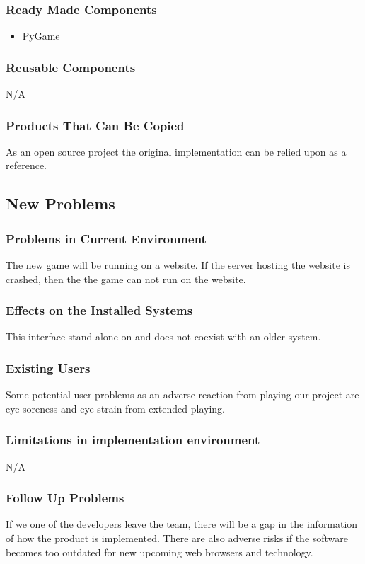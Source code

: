 \documentclass[12pt, titlepage]{article}
\begin{document}
\subsubsection{Ready Made Components}
\begin{itemize}
    \item PyGame
\end{itemize}
\subsubsection{Reusable Components}
N/A
\subsubsection{Products That Can Be Copied}
As an open source project the original implementation can be relied upon as a reference.
\subsection{New Problems}
\subsubsection{Problems in Current Environment}
The new game will be running on a website. If the server hosting the website is crashed, then the the game can not run on the website.
\subsubsection{Effects on the Installed Systems}
This interface stand alone on and does not coexist with an older system.
\subsubsection{Existing Users}
Some potential user problems as an adverse reaction from playing our project are eye soreness and eye strain from extended playing.
\subsubsection{Limitations in implementation environment}
N/A
\subsubsection{Follow Up Problems}
If we one of the developers leave the team, there will be a gap in the information of how the product is implemented. There are also adverse risks if the software becomes too outdated for new upcoming web browsers and technology.
\end{document}
